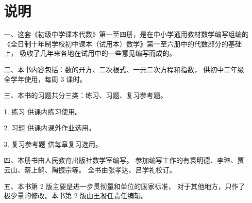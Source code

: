 
\chapter{说明}

一、这套《初级中学课本代数》第一至四册，是在中小学通用教材数学编写组编的
《全日制十年制学校初中课本（试用本）数学》第一至六册中的代数部分的基础上，
吸收了几年来各地在试用中的一些意见编写而成的。

二、本书内容包括：数的开方、二次根式、一元二次方程和指数，
供初中二年级全学年使用，每周 3 课时。

三、本书的习题共分三类：练习、习题、复习参考题。

1. 练习 \quad 供课内练习使用。

2. 习题 \quad 供课内课外作业选用。

3. 复习参考题 \quad 供每章复习选用。

四、本册书由人民教育出版社数学室编写。
参加编写工作的有袁明德、李琳、贾云山、蔡上鹤、陶振宗等。
全书由张孝达、吕学礼校订。

五、本书第 2 版主要是进一步贯彻量和单位的国家标准，
对于其他地方，只作了极少量的修改。本书第 2 版由王凝任责任编辑。





